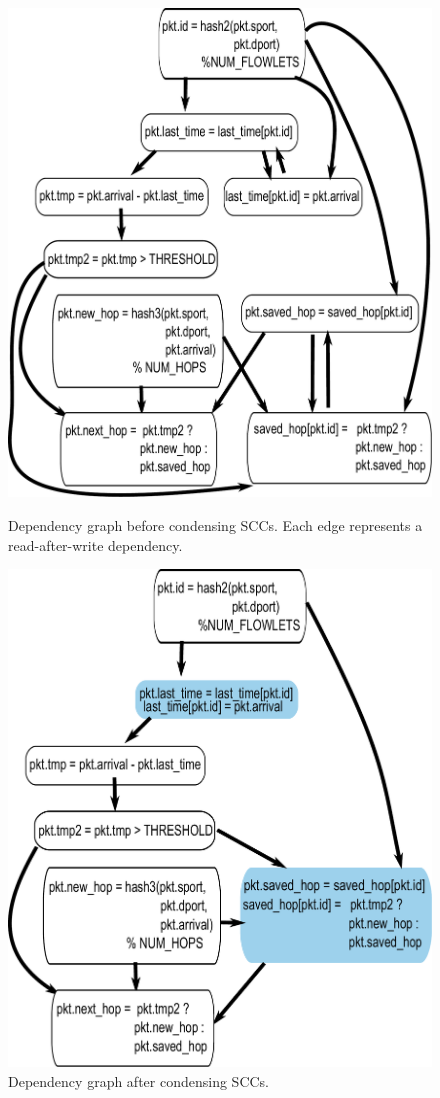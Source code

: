 \begin{figure}[!t]
\begin{minipage}{0.5\textwidth}
  \includegraphics[width=0.8\columnwidth]{deps.pdf}
  \caption{Dependency graph before condensing SCCs. Each edge represents
  a read-after-write dependency.}
  \label{fig:partitioning_before}
\end{minipage}
\begin{minipage}{0.5\textwidth}
\includegraphics[width=0.8\columnwidth]{scc.pdf}
\caption{Dependency graph after condensing SCCs.}
\label{fig:partitioning_after}
\end{minipage}
\end{figure}


